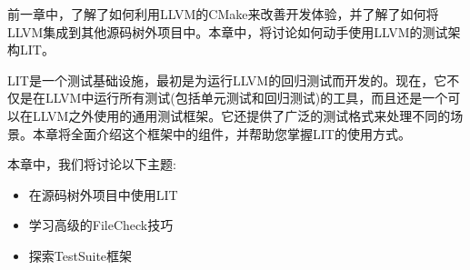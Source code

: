 前一章中，了解了如何利用LLVM的CMake来改善开发体验，并了解了如何将LLVM集成到其他源码树外项目中。本章中，将讨论如何动手使用LLVM的测试架构LIT。

LIT是一个测试基础设施，最初是为运行LLVM的回归测试而开发的。现在，它不仅是在LLVM中运行所有测试(包括单元测试和回归测试)的工具，而且还是一个可以在LLVM之外使用的通用测试框架。它还提供了广泛的测试格式来处理不同的场景。本章将全面介绍这个框架中的组件，并帮助您掌握LIT的使用方式。

本章中，我们将讨论以下主题:

\begin{itemize}
\item 在源码树外项目中使用LIT
\item 学习高级的FileCheck技巧
\item 探索TestSuite框架
\end{itemize}









































